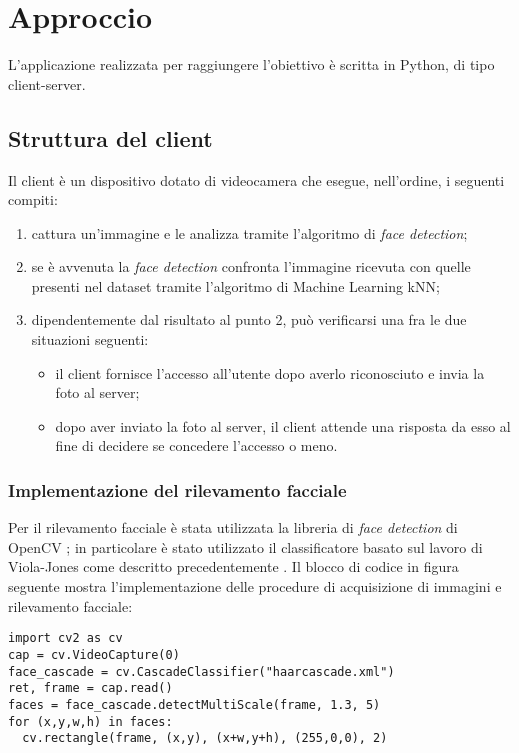 \chapter{Approccio}
L'applicazione realizzata per raggiungere l'obiettivo è scritta in Python, di tipo client-server. 
\section{Struttura del client}
Il client è un dispositivo dotato di videocamera che esegue, nell'ordine, i seguenti compiti:
\begin{enumerate} 
	\item cattura un'immagine e le analizza tramite l'algoritmo di \textit{face detection};
	\item se è avvenuta la \textit{face detection} confronta l'immagine ricevuta con quelle presenti nel dataset tramite l'algoritmo di Machine Learning kNN;
	\item dipendentemente dal risultato al punto 2, può verificarsi una fra le due situazioni seguenti:
	\begin{itemize}
		\item il client fornisce l'accesso all'utente dopo averlo riconosciuto e invia la foto al server;
		\item dopo aver inviato la foto al server, il client attende una risposta da esso al fine di decidere se concedere l'accesso o meno.
	\end{itemize}
	
\end{enumerate} 

\subsection{Implementazione del rilevamento facciale}
Per il rilevamento facciale è stata utilizzata la libreria di \textit{face detection} di OpenCV \cite{opencv_library}; in particolare è stato utilizzato il classificatore basato sul lavoro di Viola-Jones come descritto precedentemente \cite{viola2001rapid}. Il blocco di codice in figura seguente mostra l'implementazione delle procedure di acquisizione di immagini e rilevamento facciale:


\begin{lstlisting}
import cv2 as cv
cap = cv.VideoCapture(0)
face_cascade = cv.CascadeClassifier("haarcascade.xml")
ret, frame = cap.read()
faces = face_cascade.detectMultiScale(frame, 1.3, 5)
for (x,y,w,h) in faces:
  cv.rectangle(frame, (x,y), (x+w,y+h), (255,0,0), 2)
\end{lstlisting}


